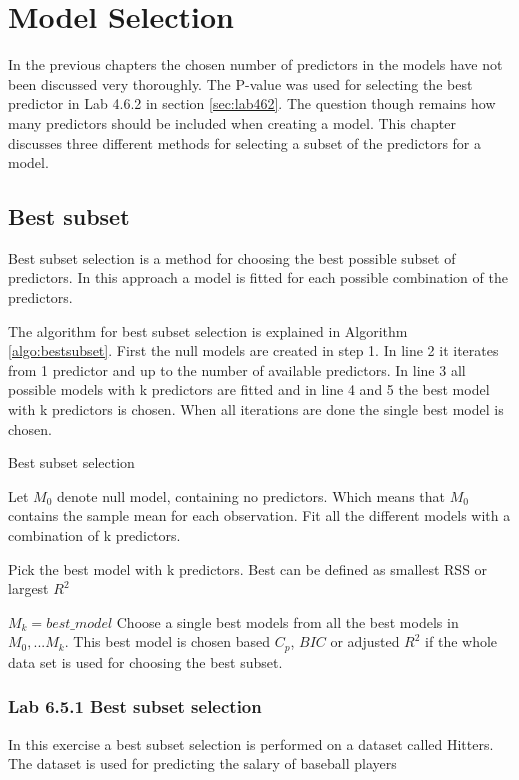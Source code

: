\chapter{Model Selection}
\label{chp:subsel}

In the previous chapters the chosen number of predictors in the models have not been discussed very thoroughly. The P-value was used for selecting the best predictor in Lab 4.6.2 in section \ref{sec:lab462}. The question though remains how many predictors should be included when creating a model. This chapter discusses three different methods for selecting a subset of the predictors for a model.

\section{Best subset}
Best subset selection is a method for choosing the best possible subset of predictors. In this approach a model is fitted for each possible combination of the predictors.

The algorithm for best subset selection is explained in Algorithm \ref{algo:bestsubset}. First the null models are created in step 1. In line 2 it iterates from 1 predictor and up to the number of available predictors. In line 3 all possible models with k predictors are fitted and in line 4 and 5 the best model with k predictors is chosen. When all iterations are done the single best model is chosen.

\begin{algorithm}
	\caption{Best subset selection}
	\label{algo:bestsubset}
	\begin{algorithmic}[1]
		\State Let $M_0$ denote null model, containing no predictors. Which means that $M_0$ contains the sample mean for each observation.
		\State Fit all the different models with a combination of k predictors.
		\State \parbox[t]{\dimexpr\linewidth-\algorithmicindent}{Pick the best model with k predictors. Best can be defined as smallest RSS or largest $R^2$}
		\State $M_k = best\_model$
		\EndFor
		\State Choose a single best models from all the best models in $M_0,...M_k$. This best model is chosen based $C_p$, $BIC$ or adjusted $R^2$ if the whole data set is used for choosing the best subset.
	\end{algorithmic}
\end{algorithm}


\subsection{Lab 6.5.1 Best subset selection}
In this exercise a best subset selection is performed on a dataset called Hitters. The dataset is used for predicting the salary of baseball players

